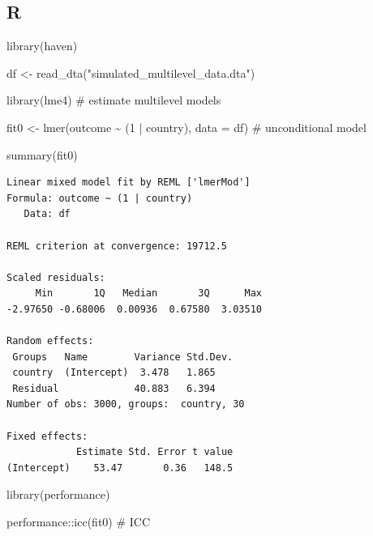 \documentclass[
  letterpaper,
  DIV=11,
  numbers=noendperiod]{scrreprt}
\newenvironment{Shaded}{\begin{snugshade}}{\end{snugshade}}
\newcommand{\AttributeTok}[1]{\textcolor[rgb]{0.40,0.45,0.13}{#1}}
\newcommand{\CommentTok}[1]{\textcolor[rgb]{0.37,0.37,0.37}{#1}}
\newcommand{\DecValTok}[1]{\textcolor[rgb]{0.68,0.00,0.00}{#1}}
\newcommand{\FunctionTok}[1]{\textcolor[rgb]{0.28,0.35,0.67}{#1}}
\newcommand{\NormalTok}[1]{\textcolor[rgb]{0.00,0.23,0.31}{#1}}
\newcommand{\OtherTok}[1]{\textcolor[rgb]{0.00,0.23,0.31}{#1}}
\newcommand{\SpecialCharTok}[1]{\textcolor[rgb]{0.37,0.37,0.37}{#1}}
\newcommand{\StringTok}[1]{\textcolor[rgb]{0.13,0.47,0.30}{#1}}
\begin{document}
\subsection{R}

\begin{Shaded}
\begin{Highlighting}[]
\FunctionTok{library}\NormalTok{(haven)}

\NormalTok{df }\OtherTok{\textless{}{-}} \FunctionTok{read\_dta}\NormalTok{(}\StringTok{"simulated\_multilevel\_data.dta"}\NormalTok{)}
\end{Highlighting}
\end{Shaded}

\begin{Shaded}
\begin{Highlighting}[]
\FunctionTok{library}\NormalTok{(lme4) }\CommentTok{\# estimate multilevel models}

\NormalTok{fit0 }\OtherTok{\textless{}{-}} \FunctionTok{lmer}\NormalTok{(outcome }\SpecialCharTok{\textasciitilde{}}\NormalTok{ (}\DecValTok{1} \SpecialCharTok{|}\NormalTok{ country),}
             \AttributeTok{data =}\NormalTok{ df) }\CommentTok{\# unconditional model}

\FunctionTok{summary}\NormalTok{(fit0)}
\end{Highlighting}
\end{Shaded}

\begin{verbatim}
Linear mixed model fit by REML ['lmerMod']
Formula: outcome ~ (1 | country)
   Data: df

REML criterion at convergence: 19712.5

Scaled residuals: 
     Min       1Q   Median       3Q      Max 
-2.97650 -0.68006  0.00936  0.67580  3.03510 

Random effects:
 Groups   Name        Variance Std.Dev.
 country  (Intercept)  3.478   1.865   
 Residual             40.883   6.394   
Number of obs: 3000, groups:  country, 30

Fixed effects:
            Estimate Std. Error t value
(Intercept)    53.47       0.36   148.5
\end{verbatim}

\begin{Shaded}
\begin{Highlighting}[]
\FunctionTok{library}\NormalTok{(performance)}

\NormalTok{performance}\SpecialCharTok{::}\FunctionTok{icc}\NormalTok{(fit0) }\CommentTok{\# ICC}
\end{Highlighting}
\end{Shaded}
\end{document}
